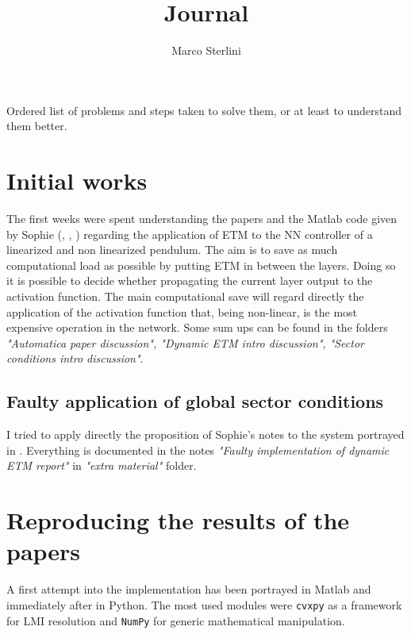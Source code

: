 \documentclass{article}
\begin{document}
\date{}
\author{Marco Sterlini}

\title{Journal}
\maketitle

Ordered list of problems and steps taken to solve them, or at least to understand them better.

\section*{Initial works}

The first weeks were spent understanding the papers and the Matlab code given by Sophie (\cite{automatica}, \cite{css-paper}, \cite{data-driven}) regarding the application of ETM to the NN controller of a linearized and non linearized pendulum. The aim is to save as much computational load as possible by putting ETM in between the layers. Doing so it is possible to decide whether propagating the current layer output to the activation function. 
The main computational save will regard directly the application of the activation function that, being non-linear, is the most expensive operation in the network.
Some sum ups can be found in the folders \textit{"Automatica paper discussion", "Dynamic ETM intro discussion", "Sector conditions intro discussion"}.

\subsection*{Faulty application of global sector conditions}

I tried to apply directly the proposition of Sophie's notes to the system portrayed in \cite{css-paper}. Everything is documented in the notes \textit{"Faulty implementation of dynamic ETM report"} in \textit{"extra material"} folder.

\section*{Reproducing the results of the papers}

A first attempt into the implementation has been portrayed in Matlab and immediately after in Python. The most used modules were \texttt{cvxpy} as a framework for LMI resolution and \texttt{NumPy} for generic mathematical manipulation. 
\end{document}
